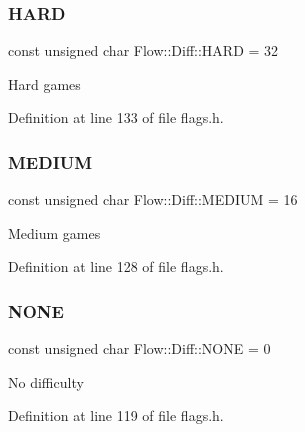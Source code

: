 \subsubsection{\texorpdfstring{H\+A\+RD}{HARD}}
{\footnotesize\ttfamily const unsigned char Flow\+::\+Diff\+::\+H\+A\+RD = 32}

Hard games 

Definition at line 133 of file flags.\+h.

\hypertarget{namespace_flow_1_1_diff_a2a571fad912e041a39f438cdabb5b205}{}\label{namespace_flow_1_1_diff_a2a571fad912e041a39f438cdabb5b205} 
\subsubsection{\texorpdfstring{M\+E\+D\+I\+UM}{MEDIUM}}
{\footnotesize\ttfamily const unsigned char Flow\+::\+Diff\+::\+M\+E\+D\+I\+UM = 16}

Medium games 

Definition at line 128 of file flags.\+h.

\hypertarget{namespace_flow_1_1_diff_a25211e3502f69e2908f0f7a0704a791c}{}\label{namespace_flow_1_1_diff_a25211e3502f69e2908f0f7a0704a791c} 
\subsubsection{\texorpdfstring{N\+O\+NE}{NONE}}
{\footnotesize\ttfamily const unsigned char Flow\+::\+Diff\+::\+N\+O\+NE = 0}

No difficulty 

Definition at line 119 of file flags.\+h.

